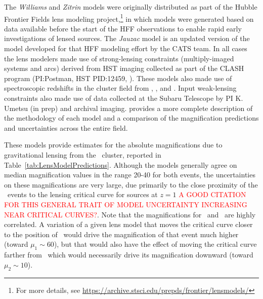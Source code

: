The {\it Williams} and {\it Zitrin} models were originally distributed
as part of the Hubble Frontier Fields lens modeling
project,\footnote{For more details, see
  \url{https://archive.stsci.edu/prepds/frontier/lensmodels/}} in
which models were generated based on data available before the start
of the HFF observations to enable rapid early investigations of lensed
sources. The {\it Jauzac} model is an updated version of the model
developed for that HFF modeling effort by the CATS team.  In all cases
the lens modelers made use of strong-lensing constraints
(multiply-imaged systems and arcs) derived from HST imaging collected
as part of the CLASH program (PI:Postman, HST PID:12459,
\citealt{Postman:2012}). These models also made use of spectroscopic
redshifts in the cluster field from \citet{Mann:2012},
\citet{Christensen:2012}, and \citet{Grillo:2015a}.  Input
weak-lensing constraints also made use of data collected at the Subaru
Telescope by PI K. Umetsu (in prep) and archival imaging.
\citet{Priewe:2016} provides a more complete description of the
methodology of each model and a comparison of the magnification
predictions and uncertainties across the entire  field.

These models provide estimates for the absolute magnifications due to
gravitational lensing from the \ cluster, reported in
Table~\ref{tab:LensModelPredictions}.  Although the models generally
agree on median magnification values in the range 20-40 for both
events, the uncertainties on these magnifications are very large, due
primarily to the close proximity of the \spock\ events to the lensing
critical curve for sources at $z=1$ \textcolor{red}{A GOOD CITATION
  FOR THIS GENERAL TRAIT OF MODEL UNCERTAINTY INCREASING NEAR CRITICAL
  CURVES?}.  Note that the magnifications for \spockone\ and
\spocktwo\ are highly correlated.  A variation of a given lens model
that moves the critical curve closer to the position of
\spockone\ would drive the magnification of that event much higher
(toward $\mu_1\sim60$), but that would also have the effect of moving
the critical curve farther from \spocktwo\, which would necessarily
drive its magnification downward (toward $\mu_2\sim10$).


